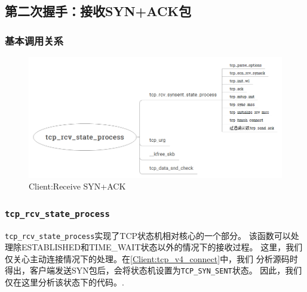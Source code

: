 \subsection{第二次握手：接收SYN+ACK包}
\label{Client:Recv SYN+ACK}

    \subsubsection{基本调用关系}

                \begin{figure}[htb]        
                    \centering
                    \includegraphics[width=\textwidth]{images/Client:Receive_SYN+ACK.png}
                    \caption{Client:Receive SYN+ACK}
                    \label{Client:Receive SYN+ACK}
                \end{figure} 

    \subsubsection{\texttt{tcp_rcv_state_process}}
        \label{SYN+ACK:tcp_rcv_state_process}
        \texttt{tcp_rcv_state_process}实现了TCP状态机相对核心的一个部分。
        该函数可以处理除ESTABLISHED和TIME\_WAIT状态以外的情况下的接收过程。
        这里，我们仅关心主动连接情况下的处理。在\ref{Client:tcp_v4_connect}中，我们
        分析源码时得出，客户端发送SYN包后，会将状态机设置为\texttt{TCP_SYN_SENT}状态。
        因此，我们仅在这里分析该状态下的代码。.

